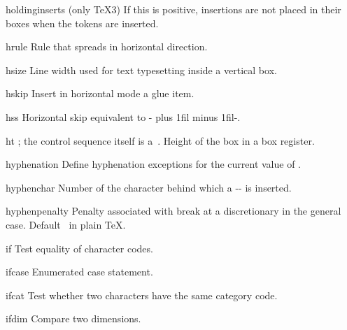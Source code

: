 \item holdinginserts
      (only \TeX3) 
      If this is positive, insertions are not placed in their boxes 
      when the  tokens are inserted.

\item hrule
      Rule that spreads in horizontal direction.

\item hsize
      Line width used for text typesetting inside a vertical box.

\item hskip 
      Insert in horizontal mode a glue item.

\item hss
      Horizontal skip equivalent to \ver-\hskip 0cm plus 1fil minus 1fil-.

\item ht
      ; the control sequence itself
      is a~.
      Height of the box in a box register. 

\item hyphenation
      Define hyphenation exceptions for the current value of .

\item hyphenchar
      Number of the character  behind which a 
      \ver-\discretionary{}{}{}- is inserted.

\item hyphenpenalty
      Penalty associated with break at a discretionary in the general case. 
      Default~ in plain \TeX.

\item if
      Test equality of character codes. 

\item ifcase%
      Enumerated case statement.

\item ifcat
      Test whether two characters have the same category code.

\item ifdim
      Compare two dimensions. 

